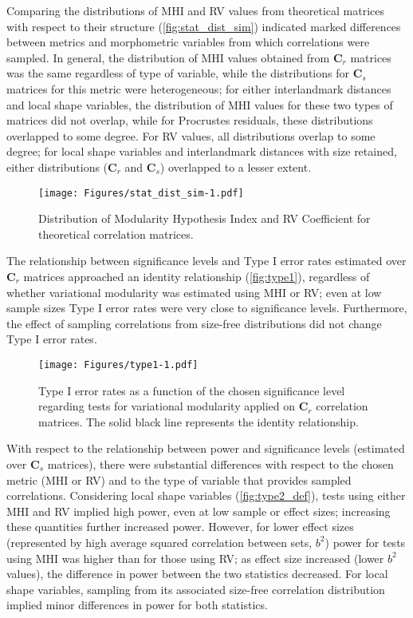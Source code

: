 \documentclass[12pt,twoside]{report}
\begin{document}
Comparing the distributions of MHI and RV values from theoretical
matrices with respect to their structure (\autoref{fig:stat_dist_sim})
indicated marked differences between metrics and morphometric variables
from which correlations were sampled. In general, the distribution of
MHI values obtained from $\mathbf{C}_r$ matrices was the same regardless
of type of variable, while the distributions for $\mathbf{C}_s$ matrices
for this metric were heterogeneous; for either interlandmark distances
and local shape variables, the distribution of MHI values for these two
types of matrices did not overlap, while for Procrustes residuals, these
distributions overlapped to some degree. For RV values, all
distributions overlap to some degree; for local shape variables and
interlandmark distances with size retained, either distributions
($\mathbf{C}_r$ and $\mathbf{C}_s$) overlapped to a lesser extent.

\begin{figure}[htbp]
\centering
\texttt{[image: Figures/stat\_dist\_sim-1.pdf]}
\caption{Distribution of Modularity Hypothesis Index and RV Coefficient
for theoretical correlation matrices. \label{fig:stat_dist_sim}}
\end{figure}

The relationship between significance levels and Type I error rates
estimated over $\mathbf{C}_r$ matrices approached an identity
relationship (\autoref{fig:type1}), regardless of whether variational
modularity was estimated using MHI or RV; even at low sample sizes Type
I error rates were very close to significance levels. Furthermore, the
effect of sampling correlations from size-free distributions did not
change Type I error rates.

\begin{figure}[htbp]
\centering
\texttt{[image: Figures/type1-1.pdf]}
\caption{Type I error rates as a function of the chosen significance
level regarding tests for variational modularity applied on
$\mathbf{C}_r$ correlation matrices. The solid black line represents the
identity relationship. \label{fig:type1}}
\end{figure}

With respect to the relationship between power and significance levels
(estimated over $\mathbf{C}_s$ matrices), there were substantial
differences with respect to the chosen metric (MHI or RV) and to the
type of variable that provides sampled correlations. Considering local
shape variables (\autoref{fig:type2_def}), tests using either MHI and RV
implied high power, even at low sample or effect sizes; increasing these
quantities further increased power. However, for lower effect sizes
(represented by high average squared correlation between sets, $b^2$)
power for tests using MHI was higher than for those using RV; as effect
size increased (lower $b^2$ values), the difference in power between the
two statistics decreased. For local shape variables, sampling from its
associated size-free correlation distribution implied minor differences
in power for both statistics.
\end{document}
